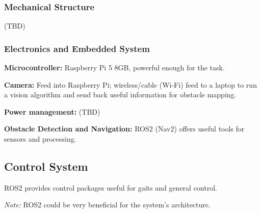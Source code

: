 \documentclass{article}
\begin{document}
\subsubsection{Mechanical Structure}
(TBD)

\subsubsection{Electronics and Embedded System}

\textbf{Microcontroller:} Raspberry Pi 5 8GB, powerful enough for the task.

\textbf{Camera:} Feed into Raspberry Pi; wireless/cable (Wi-Fi) feed to a laptop to run a vision algorithm and send back useful information for obstacle mapping.

\textbf{Power management:} (TBD)

\textbf{Obstacle Detection and Navigation:} ROS2 (Nav2) offers useful tools for sensors and processing.

\subsection{Control System}
ROS2 provides control packages useful for gaits and general control. 

\textit{Note:} ROS2 could be very beneficial for the system's architecture.
\end{document}
